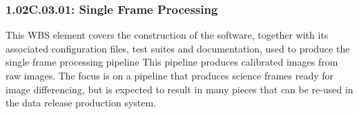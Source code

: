 \subsubsection*{1.02C.03.01: Single Frame Processing}

This WBS element covers the construction of the software,
together with its associated configuration files, test suites and
documentation, used to produce the single frame processing pipeline
This pipeline produces calibrated images from raw images.  The
focus is on a pipeline that produces science frames ready for image
differencing, but is expected to result in many pieces that can be re-used
in the data release production system.
